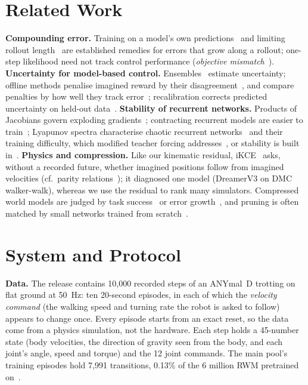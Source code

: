 \section{Related Work}\label{sec:related}
\textbf{Compounding error.} Training on a model's own
predictions~\cite{bengio2015scheduled,venkatraman2015,talvitie2017,lambert2021} and limiting rollout
length~\cite{janner2019} are established remedies for errors that grow along a rollout; one-step likelihood need not
track control performance (\emph{objective mismatch}~\cite{lambert2020objective}).
\textbf{Uncertainty for model-based control.} Ensembles~\cite{lakshminarayanan2017,chua2018} estimate uncertainty;
offline methods penalise imagined reward by their disagreement~\cite{yu2020mopo,li2025rwmu}, and compare penalties by how well they track
error~\cite{lu2022}; recalibration corrects predicted uncertainty on held-out
data~\cite{kuleshov2018accurate,malik2019calibrated}.
\textbf{Stability of recurrent networks.} Products of Jacobians govern exploding
gradients~\cite{pascanu2013difficulty}; contracting recurrent models are easier to train~\cite{miller2019stable};
Lyapunov spectra characterise chaotic recurrent networks~\cite{engelken2024lyapunov} and their training difficulty,
which modified teacher forcing addresses~\cite{mikhaeil2022chaotic,hess2023generalized}, or stability is built
in~\cite{manek2019stable}.
\textbf{Physics and compression.} Like our kinematic residual, iKCE~\cite{schafer2026} asks, without a recorded future,
whether imagined positions follow from imagined velocities (cf.\ parity relations~\cite{isermann2005}); it diagnosed one
model (DreamerV3 on DMC walker-walk), whereas we use the residual to rank many simulators. Compressed world models are judged by task
success~\cite{fu2026} or error growth~\cite{pavlova2026}, and pruning is often matched by small networks trained from
scratch~\cite{liu2019rethinking}.

\section{System and Protocol}\label{sec:setup}
\textbf{Data.} The release contains 10{,}000 recorded steps of an ANYmal~D trotting on flat ground at 50~Hz: ten
20-second episodes, in each of which the \emph{velocity command} (the walking speed and turning rate the robot is
asked to follow) appears to change once. Every episode starts from an exact reset, so the data come from a physics
simulation, not the hardware. Each step holds a 45-number state (body velocities, the direction of gravity seen from
the body, and each joint's angle, speed and torque) and the 12 joint commands. The main pool's training episodes hold
7{,}991 transitions, 0.13\% of the 6 million RWM pretrained
on~\cite[Table~1]{li2025rwm}.

